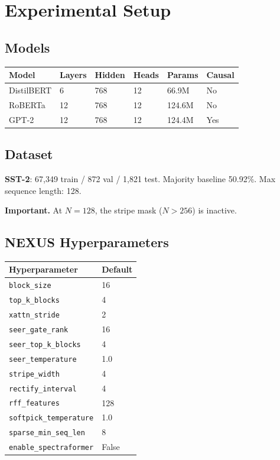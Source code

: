 \section{Experimental Setup}

\subsection{Models}

\begin{table}[H]
\centering
\small
\begin{tabular}{llllll}
\toprule
\textbf{Model} & \textbf{Layers} & \textbf{Hidden} & \textbf{Heads} & \textbf{Params} & \textbf{Causal} \\
\midrule
DistilBERT & 6 & 768 & 12 & 66.9M & No \\
RoBERTa & 12 & 768 & 12 & 124.6M & No \\
GPT-2 & 12 & 768 & 12 & 124.4M & Yes \\
\bottomrule
\end{tabular}
\end{table}

\subsection{Dataset}

\textbf{SST-2}: 67,349 train / 872 val / 1,821 test. Majority baseline 50.92\%.
Max sequence length: 128.

\textbf{Important.} At $N = 128$, the stripe mask ($N > 256$) is inactive.

\subsection{NEXUS Hyperparameters}

\begin{table}[H]
\centering
\small
\begin{tabular}{ll}
\toprule
\textbf{Hyperparameter} & \textbf{Default} \\
\midrule
\texttt{block\_size} & 16 \\
\texttt{top\_k\_blocks} & 4 \\
\texttt{xattn\_stride} & 2 \\
\texttt{seer\_gate\_rank} & 16 \\
\texttt{seer\_top\_k\_blocks} & 4 \\
\texttt{seer\_temperature} & 1.0 \\
\texttt{stripe\_width} & 4 \\
\texttt{rectify\_interval} & 4 \\
\texttt{rff\_features} & 128 \\
\texttt{softpick\_temperature} & 1.0 \\
\texttt{sparse\_min\_seq\_len} & 8 \\
\texttt{enable\_spectraformer} & False \\
\bottomrule
\end{tabular}
\end{table}


